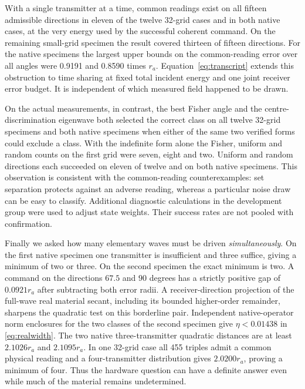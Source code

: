 With a single transmitter at a time, common readings exist on all fifteen admissible directions in eleven of the twelve 32-grid cases and in both native cases, at the very energy used by the successful coherent command. On the remaining small-grid specimen the result covered thirteen of fifteen directions. For the native specimens the largest upper bounds on the common-reading error over all angles were 0.9191 and 0.8590 times $r_a$. Equation~\eqref{eq:transcript} extends this obstruction to time sharing at fixed total incident energy and one joint receiver error budget. It is independent of which measured field happened to be drawn.

On the actual measurements, in contrast, the best Fisher angle and the centre-discrimination eigenwave both selected the correct class on all twelve 32-grid specimens and both native specimens when either of the same two verified forms could exclude a class. With the indefinite form alone the Fisher, uniform and random counts on the first grid were seven, eight and two. Uniform and random directions each succeeded on eleven of twelve and on both native specimens. This observation is consistent with the common-reading counterexamples: set separation protects against an adverse reading, whereas a particular noise draw can be easy to classify. Additional diagnostic calculations in the development group were used to adjust state weights. Their success rates are not pooled with confirmation.

Finally we asked how many elementary waves must be driven \emph{simultaneously}. On the first native specimen one transmitter is insufficient and three suffice, giving a minimum of two or three. On the second specimen the exact minimum is two. A command on the directions $67.5$ and $90$ degrees has a strictly positive gap of $0.0921r_a$ after subtracting both error radii. A receiver-direction projection of the full-wave real material secant, including its bounded higher-order remainder, sharpens the quadratic test on this borderline pair. Independent native-operator norm enclosures for the two classes of the second specimen give $\eta<0.01438$ in \eqref{eq:realwidth}. The two native three-transmitter quadratic distances are at least $2.1026r_a$ and $2.1095r_a$. In one 32-grid case all 455 triples admit a common physical reading and a four-transmitter distribution gives $2.0200r_a$, proving a minimum of four. Thus the hardware question can have a definite answer even while much of the material remains undetermined.


